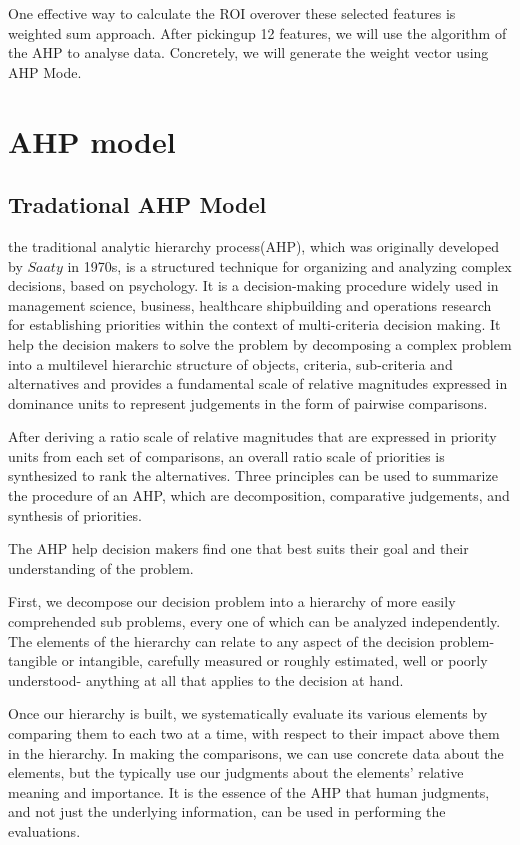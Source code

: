 One effective way to calculate the ROI overover these selected features is weighted sum approach. After pickingup 12 features, we will use the algorithm of the AHP to analyse data. Concretely, we will generate the weight vector using AHP Mode.

\section{AHP model}
\subsection{Tradational AHP Model}
	the traditional analytic hierarchy process(AHP), which was originally developed by $Saaty$ in 1970s\cite{url4}, is a structured technique for organizing and analyzing complex decisions, based on psychology. It is a decision-making procedure widely used in management science, business, healthcare shipbuilding\cite{url5} and operations research for establishing priorities within the context of multi-criteria decision making. It help the decision makers to solve the problem by decomposing a complex problem into a multilevel hierarchic structure of objects, criteria, sub-criteria and alternatives and provides a fundamental scale of relative magnitudes expressed in dominance units to represent judgements in the form of pairwise comparisons\cite{url2}.

	After deriving a ratio scale of relative magnitudes that are expressed in priority units from each set of comparisons, an overall ratio scale of priorities is synthesized to rank the alternatives\cite{url6}. Three principles can be used to summarize the procedure of an AHP, which are decomposition, comparative judgements, and synthesis of priorities\cite{url7}.

	The AHP help decision makers find one that best suits their goal and their understanding of the problem.

	First, we decompose our decision problem into a hierarchy of more easily comprehended sub problems, every one of which can be analyzed independently. The elements of the hierarchy can relate to any aspect of the decision problem-tangible or intangible, carefully measured or roughly estimated, well or poorly understood- anything at all that applies to the decision at hand.

	Once our hierarchy is built, we systematically evaluate its various elements by comparing them to each two at a time, with respect to their impact above them in the hierarchy. In making the comparisons, we can use concrete data about the elements, but the typically use our judgments about the elements' relative meaning and importance. It is the essence of the AHP that human judgments, and not just the underlying information, can be used in performing the evaluations.

